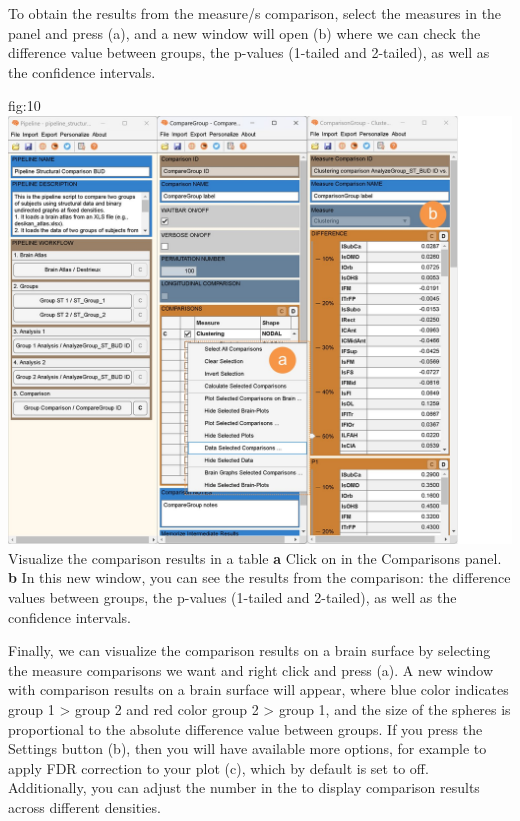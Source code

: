 \documentclass[justified]{tufte-handout}
\begin{document}
To obtain the results from the measure/s comparison, select the measures in the  panel and press ({a}), and a new window will open ({b}) where we can check the difference value between groups, the p-values (1-tailed and 2-tailed), as well as the confidence intervals.

	{fig:10}
	{
	\includegraphics{fig10.jpg}
	}
	{Visualize the comparison results in a table}
	{
	{\bf a} Click on  in the Comparisons panel.
	{\bf b} In this new window, you can see the results from the comparison: the difference values between groups, the p-values (1-tailed and 2-tailed), as well as the confidence intervals.
	}
 
 \clearpage
 
Finally, we can visualize the comparison results on a brain surface by selecting the measure comparisons we want and right click and press  ({a}). A new window with comparison results on a brain surface will appear, where blue color indicates group 1 > group 2 and red color group 2 > group 1, and the size of the spheres is proportional to the absolute difference value between groups. If you press the Settings button ({b}), then you will have available more options, for example to apply FDR correction to your plot ({c}), which by default is set to off. Additionally, you can adjust the number in the  to display comparison results across different densities.
\end{document}
